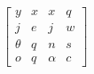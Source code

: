 \documentclass{standalone}
\begin{document}
        $\begin{bmatrix} y & x & x & q \\ j & e & j & w \\ \theta & q & n & s \\ o & q & \alpha & c \end{bmatrix}$
        
\end{document}
